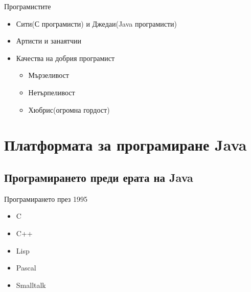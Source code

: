 \documentclass{beamer}
\begin{document}
\begin{frame}{Програмистите}
  \transdissolve
  \begin{itemize}
  \item Сити(С програмисти) и Джедаи(Java програмисти) \pause
  \item Артисти и занаятчии \pause
  \item Качества на добрия програмист \pause
    \begin{itemize}
      \item Мързеливост \pause
      \item Нетърпеливост \pause
      \item Хюбрис(огромна гордост)
    \end{itemize}
  \end{itemize}
\end{frame}

\section{Платформата за програмиране Java}
\subsection{Програмирането преди ерата на Java}

\begin{frame}{Програмирането през 1995}
  \transdissolve
  \begin{itemize}
    \item C
    \item C++
    \item Lisp
    \item Pascal
    \item Smalltalk
  \end{itemize}
\end{frame}
\end{document}
